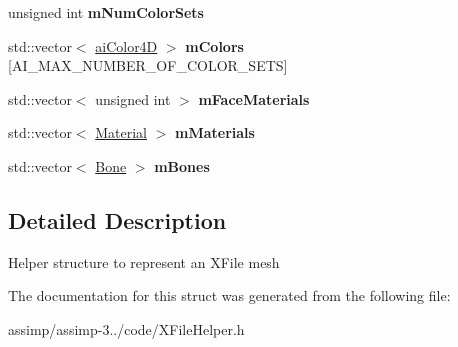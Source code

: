 \begin{DoxyCompactItemize}
\item 
\hypertarget{struct_assimp_1_1_x_file_1_1_mesh_a52a004fd6b4dbd4f9f7cfa163980e0fd}{unsigned int {\bfseries m\+Num\+Color\+Sets}}\label{struct_assimp_1_1_x_file_1_1_mesh_a52a004fd6b4dbd4f9f7cfa163980e0fd}

\item 
\hypertarget{struct_assimp_1_1_x_file_1_1_mesh_acdb0116ca3e899400a29cca9a2b65793}{std\+::vector$<$ \hyperlink{structai_color4_d}{ai\+Color4\+D} $>$ {\bfseries m\+Colors} \mbox{[}A\+I\+\_\+\+M\+A\+X\+\_\+\+N\+U\+M\+B\+E\+R\+\_\+\+O\+F\+\_\+\+C\+O\+L\+O\+R\+\_\+\+S\+E\+T\+S\mbox{]}}\label{struct_assimp_1_1_x_file_1_1_mesh_acdb0116ca3e899400a29cca9a2b65793}

\item 
\hypertarget{struct_assimp_1_1_x_file_1_1_mesh_a5824d04154da12b8cc45156e641892ca}{std\+::vector$<$ unsigned int $>$ {\bfseries m\+Face\+Materials}}\label{struct_assimp_1_1_x_file_1_1_mesh_a5824d04154da12b8cc45156e641892ca}

\item 
\hypertarget{struct_assimp_1_1_x_file_1_1_mesh_a67626695971025b84fd1b1dac7912e7d}{std\+::vector$<$ \hyperlink{struct_assimp_1_1_x_file_1_1_material}{Material} $>$ {\bfseries m\+Materials}}\label{struct_assimp_1_1_x_file_1_1_mesh_a67626695971025b84fd1b1dac7912e7d}

\item 
\hypertarget{struct_assimp_1_1_x_file_1_1_mesh_a2d872050bcdbdb06f5c7263642de1c39}{std\+::vector$<$ \hyperlink{struct_assimp_1_1_x_file_1_1_bone}{Bone} $>$ {\bfseries m\+Bones}}\label{struct_assimp_1_1_x_file_1_1_mesh_a2d872050bcdbdb06f5c7263642de1c39}

\end{DoxyCompactItemize}


\subsection{Detailed Description}
Helper structure to represent an X\+File mesh 

The documentation for this struct was generated from the following file\+:\begin{DoxyCompactItemize}
\item 
assimp/assimp-\/3../code/X\+File\+Helper.\+h\end{DoxyCompactItemize}
